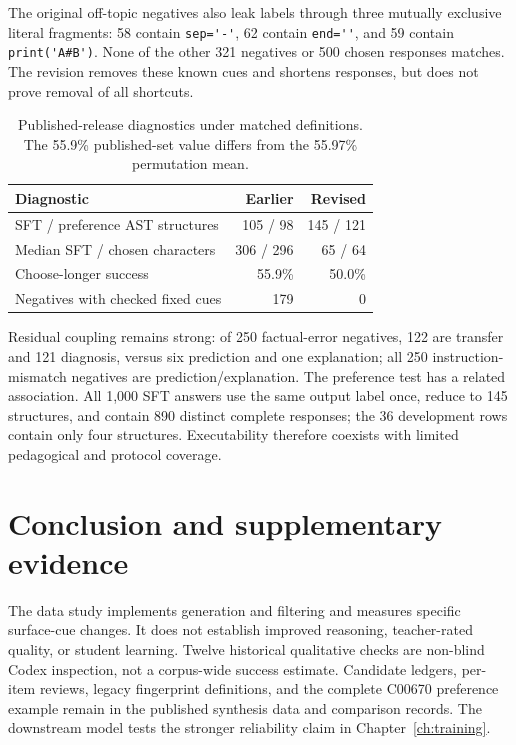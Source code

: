 The original off-topic negatives also leak labels through three mutually exclusive literal fragments: 58 contain \verb|sep='-'|, 62 contain \verb|end=''|, and 59 contain \verb|print('A#B')|. None of the other 321 negatives or 500 chosen responses matches. The revision removes these known cues and shortens responses, but does not prove removal of all shortcuts.

\begin{table}[H]\centering\small
\caption{Published-release diagnostics under matched definitions. The 55.9\% published-set value differs from the 55.97\% permutation mean.}\label{tab:data-revision}
\begin{tabularx}{\linewidth}{@{}Yrr@{}}\toprule
Diagnostic & Earlier & Revised\\\midrule
SFT / preference AST structures & 105 / 98 & 145 / 121\\
Median SFT / chosen characters & 306 / 296 & 65 / 64\\
Choose-longer success & 55.9\% & 50.0\%\\
Negatives with checked fixed cues & 179 & 0\\\bottomrule
\end{tabularx}
\end{table}\FloatBarrier

Residual coupling remains strong: of 250 factual-error negatives, 122 are transfer and 121 diagnosis, versus six prediction and one explanation; all 250 instruction-mismatch negatives are prediction/explanation. The preference test has a related association. All 1,000 SFT answers use the same output label once, reduce to 145 structures, and contain 890 distinct complete responses; the 36 development rows contain only four structures. Executability therefore coexists with limited pedagogical and protocol coverage.

\section{Conclusion and supplementary evidence}
The data study implements generation and filtering and measures specific surface-cue changes. It does not establish improved reasoning, teacher-rated quality, or student learning. Twelve historical qualitative checks are non-blind Codex inspection, not a corpus-wide success estimate. Candidate ledgers, per-item reviews, legacy fingerprint definitions, and the complete C00670 preference example remain in the published synthesis data and comparison records. The downstream model tests the stronger reliability claim in Chapter~\ref{ch:training}.
